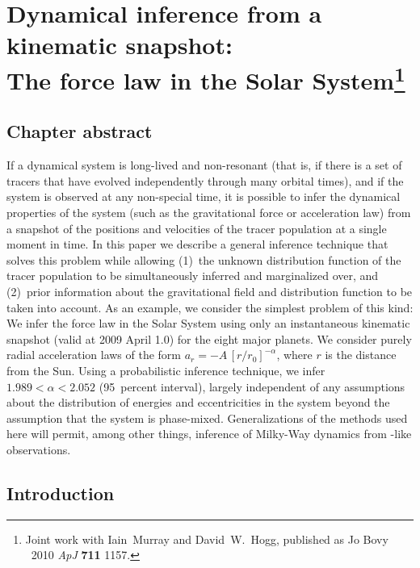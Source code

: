 
\chapter[Dynamical inference from a kinematic snapshot: The force law in the Solar System]{Dynamical inference from a kinematic snapshot:\\
  The force law in the Solar System\protect\footnote{Joint work with
  Iain~Murray and David~W.~Hogg, published as Jo Bovy \etal\
  2010 \emph{ApJ} {\bf 711} 1157.}\label{chap:solarsystem}}

\section{Chapter abstract}
If a dynamical system is long-lived and non-resonant (that is, if
there is a set of tracers that have evolved independently through many
orbital times), and if the system is observed at any non-special time,
it is possible to infer the dynamical properties of the system (such
as the gravitational force or acceleration law) from a snapshot of the
positions and velocities of the tracer population at a single moment
in time. In this paper we describe a general inference technique that
solves this problem while allowing (1)~the unknown distribution
function of the tracer population to be simultaneously inferred and
marginalized over, and (2)~prior information about the gravitational
field and distribution function to be taken into account. As an
example, we consider the simplest problem of this kind: We infer the
force law in the Solar System using only an instantaneous kinematic
snapshot (valid at 2009 April 1.0) for the eight major planets. We
consider purely radial acceleration laws of the form $a_r=
-A\,[r/r_0]^{-\alpha}$, where $r$ is the distance from the Sun.  Using
a probabilistic inference technique, we infer $1.989<\alpha<2.052$
(95~percent interval), largely independent of any assumptions about
the distribution of energies and eccentricities in the system beyond
the assumption that the system is phase-mixed. Generalizations of the
methods used here will permit, among other things, inference of
Milky-Way dynamics from \Gaia-like observations.

\section{Introduction}

